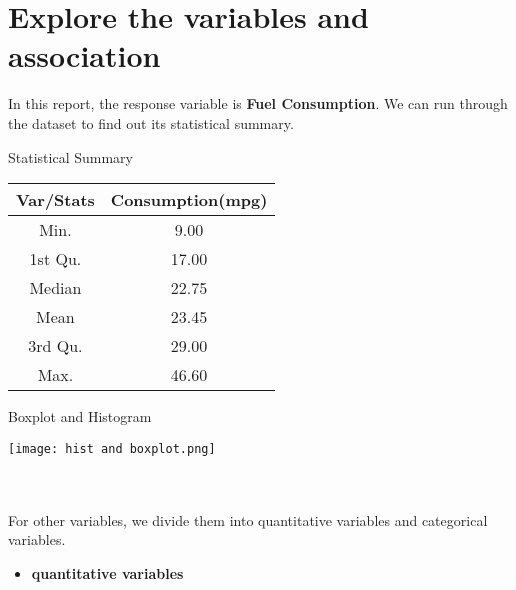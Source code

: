 \documentclass[12pt]{article}
\begin{document}
\section{Explore the variables and association\vspace{-0.4cm}}
In this report, the response variable is \textbf{Fuel Consumption}. We can run through the dataset to find out its statistical summary.\\
    \begin{minipage}{\textwidth}
        \begin{minipage}[h]{0.5\textwidth}
            \centering
            \makeatletter{}\makeatother\caption{Statistical Summary} 
        
             \begin{tabular}{cc}
        \toprule
        Var/Stats & Consumption(mpg) \\
        \midrule
        \textsf{Min.} & 9.00 \\
        \textsf{1st Qu.} & 17.00  \\
        \textsf{Median} & 22.75 \\
        \textsf{Mean} & 23.45  \\
        \textsf{3rd Qu.} & 29.00  \\
        \textsf{Max.} & 46.60 \\
        \bottomrule
    \end{tabular}
            
            \label{a}
        \end{minipage}
        \begin{minipage}[h]{0.5\textwidth}
            \centering
            \makeatletter{}\makeatother\caption{Boxplot and Histogram}
            \texttt{[image: hist and boxplot.png]}
            
            \label{b}   
        \end{minipage}
    \end{minipage}
    \\ \\
For other variables, we divide them into quantitative variables and categorical variables.
\begin{itemize}
    \item \textbf{quantitative variables} 
\end{itemize}
\end{document}

